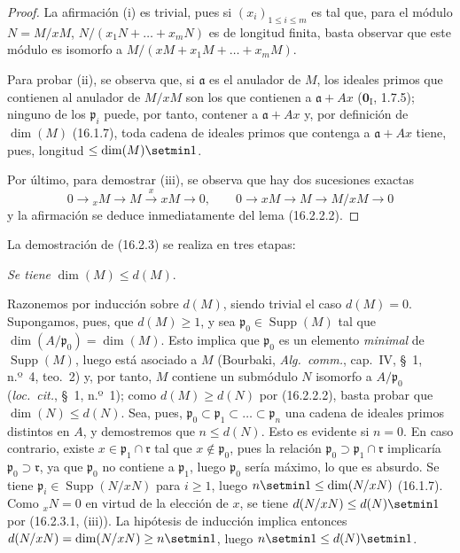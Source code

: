 \begin{proof}
La afirmación (i) es trivial, pues si $(x_i)_{1\leq i\leq m}$ es tal que, para
el módulo $N=M/xM$, $N/(x_1N+\ldots+x_mN)$ es de longitud finita, basta
observar que este módulo es isomorfo a
$M/(xM+x_1M+\ldots+x_mM)$.

Para probar (ii), se observa que, si $\mathfrak{a}$ es el anulador de $M$, los
ideales primos que contienen al anulador de $M/xM$ son los que contienen a
$\mathfrak{a}+Ax$ ($\mathbf{0}_{\mathrm I}$, 1.7.5); ninguno de los
$\mathfrak{p}_i$ puede, por tanto, contener a $\mathfrak{a}+Ax$ y, por
definición de $\dim(M)$ (16.1.7), toda cadena de ideales primos que contenga a
$\mathfrak{a}+Ax$ tiene, pues, longitud $\leq\dim(M)\setmin 1$.


Por último, para demostrar (iii), se observa que hay dos sucesiones exactas
\[
  0\to{}_xM\to M\xrightarrow{x}xM\to0,\qquad
  0\to xM\to M\to M/xM\to0
\]
y la afirmación se deduce inmediatamente del lema (16.2.2.2).
\end{proof}

La demostración de (16.2.3) se realiza en tres etapas:

\begin{env}[16.2.3.2]
\label{0.16.2.3.2-fr}
\emph{Se tiene} $\dim(M)\leq d(M)$.
\end{env}

Razonemos por inducción sobre $d(M)$, siendo trivial el caso $d(M)=0$.
Supongamos, pues, que $d(M)\geq1$, y sea
$\mathfrak{p}_0\in\operatorname{Supp}(M)$ tal que
$\dim(A/\mathfrak{p}_0)=\dim(M)$. Esto implica que $\mathfrak{p}_0$ es un
elemento \emph{minimal} de $\operatorname{Supp}(M)$, luego está asociado a $M$
(Bourbaki, \emph{Alg.~comm.}, cap.~IV, \S~1, n.º~4, teo.~2) y, por tanto, $M$
contiene un submódulo $N$ isomorfo a $A/\mathfrak{p}_0$ (\emph{loc.~cit.},
\S~1, n.º~1); como $d(M)\geq d(N)$ por (16.2.2.2), basta probar que
$\dim(N)\leq d(N)$. Sea, pues,
$\mathfrak{p}_0\subset\mathfrak{p}_1\subset\ldots\subset\mathfrak{p}_n$ una
cadena de ideales primos distintos en $A$, y demostremos que $n\leq d(N)$.
Esto es evidente si $n=0$. En caso contrario, existe
$x\in\mathfrak{p}_1\cap\mathfrak{r}$ tal que $x\notin\mathfrak{p}_0$, pues la
relación $\mathfrak{p}_0\supset\mathfrak{p}_1\cap\mathfrak{r}$ implicaría
$\mathfrak{p}_0\supset\mathfrak{r}$, ya que $\mathfrak{p}_0$ no contiene a
$\mathfrak{p}_1$, luego $\mathfrak{p}_0$ sería máximo, lo que es absurdo.
Se tiene $\mathfrak{p}_i\in\operatorname{Supp}(N/xN)$ para $i\geq1$, luego
$n\setmin 1\leq\dim(N/xN)$ (16.1.7). Como ${}_xN=0$ en virtud de la elección de $x$,
se tiene $d(N/xN)\leq d(N)\setmin 1$ por (16.2.3.1, (iii)). La hipótesis de inducción
implica entonces $d(N/xN)=\dim(N/xN)\geq n\setmin 1$, luego
$n\setmin 1\leq d(N)\setmin 1$.

